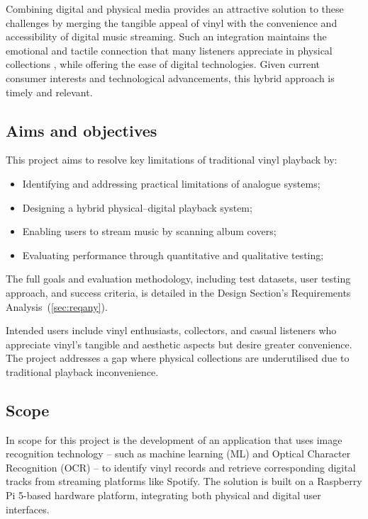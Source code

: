             Combining digital and physical media provides an attractive solution to these challenges by merging the tangible appeal of vinyl with the convenience and accessibility of digital music streaming. Such an integration maintains the emotional and tactile connection that many listeners appreciate in physical collections \cite{Liu2020}, while offering the ease of digital technologies. Given current consumer interests and technological advancements, this hybrid approach is timely and relevant.
        
        \subsection{Aims and objectives}
    
            This project aims to resolve key limitations of traditional vinyl playback by:
            \begin{itemize}
                \item Identifying and addressing practical limitations of analogue systems;
                \item Designing a hybrid physical–digital playback system;
                \item Enabling users to stream music by scanning album covers;
                \item Evaluating performance through quantitative and qualitative testing;
            \end{itemize}
    
            The full goals and evaluation methodology, including test datasets, user testing approach, and success criteria, is detailed in the Design Section's Requirements Analysis~(\ref{sec:reqany}).
    
            Intended users include vinyl enthusiasts, collectors, and casual listeners who appreciate vinyl's tangible and aesthetic aspects but desire greater convenience. The project addresses a gap where physical collections are underutilised due to traditional playback inconvenience.
        
        \subsection{Scope}
    
            In scope for this project is the development of an application that uses image recognition technology -- such as machine learning (ML) and Optical Character Recognition (OCR) -- to identify vinyl records and retrieve corresponding digital tracks from streaming platforms like Spotify. The solution is built on a Raspberry Pi 5-based hardware platform, integrating both physical and digital user interfaces.
    
